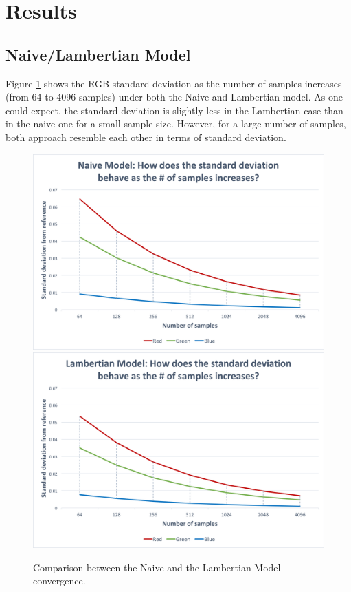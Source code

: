 \documentclass{article}
\begin{document}
\section*{Results}

\subsection*{Naive/Lambertian Model}
Figure \ref{fig:lamb} shows the RGB standard deviation as the number of samples increases (from 64 to 4096 samples) under both the Naive and Lambertian model. As one could expect, the standard deviation is slightly less in the Lambertian case than in the naive one for a small sample size. However, for a large number of samples, both approach resemble each other in terms of standard deviation.

\begin{figure}[p]
\centering
\includegraphics[width=\textwidth]{assets/naive_stdev}
\\
\includegraphics[width=\textwidth]{assets/lamb_stdev}

\caption{Comparison between the Naive and the Lambertian Model convergence.}
\label{fig:lamb}
\end{figure}
\end{document}

